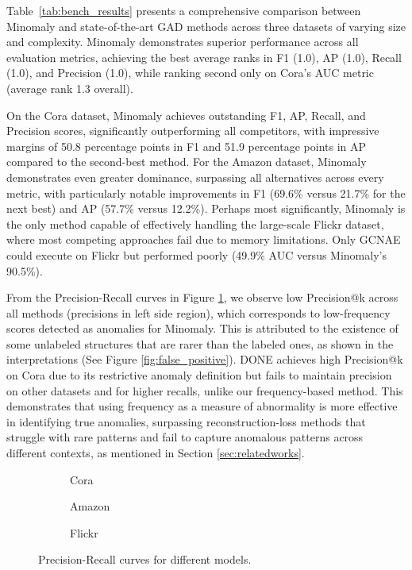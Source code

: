 \documentclass[pdflatex,sn-mathphys-num]{sn-jnl}%
\theoremstyle{thmstyleone}%
\theoremstyle{thmstyletwo}%
\theoremstyle{thmstylethree}%
\begin{document}

Table~\ref{tab:bench_results} presents a comprehensive comparison between Minomaly and state-of-the-art GAD methods across three datasets of varying size and complexity. Minomaly demonstrates superior performance across all evaluation metrics, achieving the best average ranks in F1 (1.0), AP (1.0), Recall (1.0), and Precision (1.0), while ranking second only on Cora's AUC metric (average rank 1.3 overall).

On the Cora dataset, Minomaly achieves outstanding F1, AP, Recall, and Precision scores, significantly outperforming all competitors, with impressive margins of 50.8 percentage points in F1 and 51.9 percentage points in AP compared to the second-best method. For the Amazon dataset, Minomaly demonstrates even greater dominance, surpassing all alternatives across every metric, with particularly notable improvements in F1 (69.6\% versus 21.7\% for the next best) and AP (57.7\% versus 12.2\%). Perhaps most significantly, Minomaly is the only method capable of effectively handling the large-scale Flickr dataset, where most competing approaches fail due to memory limitations. Only GCNAE could execute on Flickr but performed poorly (49.9\% AUC versus Minomaly's 90.5\%).



From the Precision-Recall curves in Figure \ref{fig:pr_curve}, we observe low Precision@k across all methods (precisions in left side region), which corresponds to low-frequency scores detected as anomalies for Minomaly. This is attributed to the existence of some unlabeled structures that are rarer than the labeled ones, as shown in the interpretations (See Figure \ref{fig:false_positive}). DONE achieves high Precision@k on Cora due to its restrictive anomaly definition but fails to maintain precision on other datasets and for higher recalls, unlike our frequency-based method. This demonstrates that using frequency as a measure of abnormality is more effective in identifying true anomalies, surpassing reconstruction-loss methods that struggle with rare patterns and fail to capture anomalous patterns across different contexts, as mentioned in Section \ref{sec:relatedworks}.


\begin{figure}[H]
    \centering
    \begin{subfigure}{0.32\textwidth}
        \resizebox{\linewidth}{!}{}
        \caption{Cora}
    \end{subfigure}
    \begin{subfigure}{0.32\textwidth}
        \resizebox{\linewidth}{!}{}
        \caption{Amazon}
    \end{subfigure}
    \begin{subfigure}{0.32\textwidth}
        \resizebox{\linewidth}{!}{}
        \caption{Flickr}
    \end{subfigure}
    \caption{Precision-Recall curves for different models.}
    \label{fig:pr_curve}
\end{figure}
\end{document}
